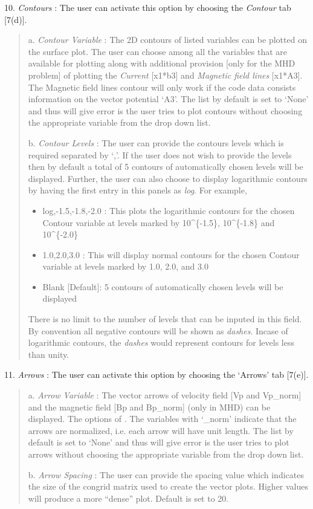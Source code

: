 \documentclass[letterpaper,10pt,english]{sphinxmanual}
\begin{document}
10. \emph{Contours} : The user can activate this option by choosing the
\emph{Contour} tab {[}7(d){]}.
\begin{quote}

a. \emph{Contour Variable} : The 2D contours of listed variables can be plotted on
the surface plot. The user can choose among all the variables
that are available for plotting along with additional provision
{[}only for the MHD problem{]} of plotting the \emph{Current}
{[}x1*b3{]} and \emph{Magnetic field lines} {[}x1*A3{]}. The Magnetic
field lines contour will only work if the code data consists
information on the vector potential `A3'.
The list by default is set to `None' and thus
will give error is the user tries to plot contours without
choosing the appropriate variable from the drop down list.

b. \emph{Contour Levels} : The user can provide the contours levels which is required separated by `,'. If the user does not
wish to provide the levels then by default a total of 5 contours of automatically chosen levels will be displayed. Further, the
user can also choose to display logarithmic contours by having the
first entry in this panels as \emph{log}. For example,
\begin{itemize}
\item {} 
log,-1.5,-1.8,-2.0 : This plots the logarithmic contours for the chosen Contour variable at levels marked by 10\textasciicircum{}\{-1.5\}, 10\textasciicircum{}\{-1.8\} and 10\textasciicircum{}\{-2.0\}

\item {} 
1.0,2.0,3.0 : This will display normal contours for the chosen Contour variable at levels marked by 1.0, 2.0, and 3.0

\item {} 
Blank {[}Default{]}: 5 contours of automatically chosen  levels will be displayed

\end{itemize}

There is no limit to the number of levels that can be inputed in this
field. By convention all negative contours will be shown as
\emph{dashes}. Incase of logarithmic contours, the \emph{dashes} would
represent contours for levels less than unity.
\end{quote}

11. \emph{Arrows} : The user can activate this option by choosing the
`Arrows' tab {[}7(e){]}.
\begin{quote}

a. \emph{Arrow Variable} : The vector arrows of velocity field {[}Vp and
Vp\_norm{]} and the magnetic field {[}Bp and Bp\_norm{]} (only in
MHD) can be displayed. The options of . The variables with `\_norm' indicate that the
arrows are normalized, i.e. each arrow will have unit length.
The list by default is set to `None' and thus
will give error is the user tries to plot arrows without
choosing the appropriate variable from the drop down list.

b. \emph{Arrow Spacing} : The user can provide the spacing
value which indicates the size of the congrid matrix used to
create the vector plots. Higher values will produce a more
``dense'' plot. Default is set to 20.
\end{quote}
\end{document}
